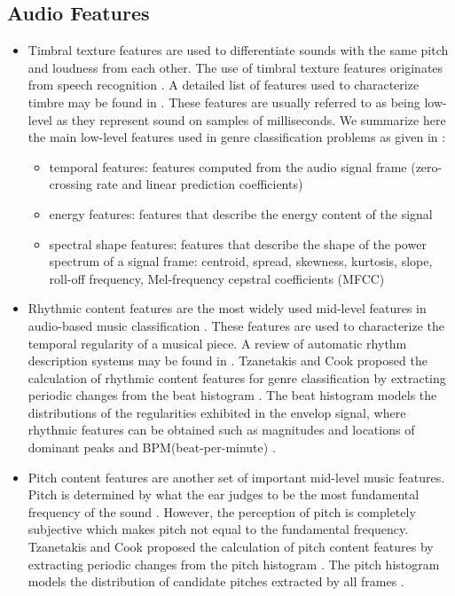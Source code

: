 \documentclass[a4paper,11pt,oneside]{article}
\begin{document}
\subsection{Audio Features}
\begin{itemize}
\item
Timbral texture features are used to differentiate sounds with the same pitch and loudness from each other. 
The use of timbral texture features originates from speech recognition \cite{book}. A detailed list of features used to 
characterize timbre may be found in \cite{peeters2004large}. These features are usually referred to as being low-level as they represent 
sound on samples of milliseconds. We summarize here the main low-level features used in genre classification problems as given in \cite{survey1}:
\begin{itemize}
  \item temporal features: features computed from the audio signal frame (zero-crossing rate and
   linear prediction coefficients)
  \item energy features: features that describe the energy content of the signal
  \item spectral shape features: features that describe the shape of the power spectrum
      of a signal frame: centroid, spread, skewness, kurtosis, slope, roll-off frequency, Mel-frequency cepstral
      coefficients (MFCC)
\end{itemize}
\item
Rhythmic content features are the most widely used mid-level features in audio-based music classification \cite{survey2}.
These features are used to characterize the temporal regularity of a musical piece. A review of automatic rhythm description 
systems may be found in \cite{gouyon2005review}. Tzanetakis and Cook proposed the calculation of rhythmic content features for genre classification
by extracting periodic changes from the beat histogram \cite{tzan}. The beat histogram models the distributions 
of the regularities exhibited in the envelop signal, where rhythmic features can be obtained such as magnitudes 
and locations of dominant peaks and BPM(beat-per-minute) \cite{survey2}.
\item
Pitch content features are another set of important mid-level music features. Pitch is determined by what
the ear judges to be the most fundamental frequency of the sound \cite{macy2001grove}. However, the perception 
of pitch is completely subjective which makes pitch not equal to the fundamental frequency. Tzanetakis and Cook proposed
the calculation of pitch content features by extracting periodic changes from the pitch histogram \cite{tzan}. The
pitch histogram models the distribution of candidate pitches extracted by all frames \cite{survey2}.
\end{itemize}
\end{document}
